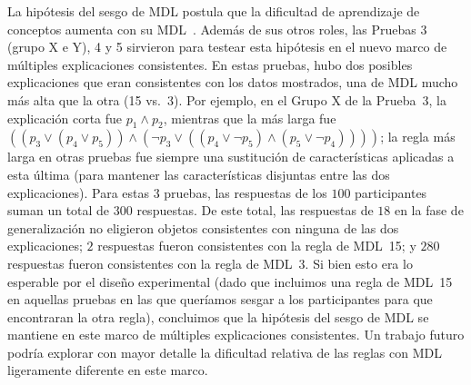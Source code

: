 La hipótesis del sesgo de MDL postula que la dificultad de aprendizaje de conceptos aumenta con su MDL~\cite{feldman2000minimization}. Además de sus otros roles, las Pruebas 3 (grupo X e Y), 4 y 5 sirvieron para testear esta hipótesis en el nuevo marco de múltiples explicaciones consistentes. En estas pruebas, hubo dos posibles explicaciones que eran consistentes con los datos mostrados, una de MDL mucho más alta que la otra (15 vs.\ 3). Por ejemplo, en el Grupo X de la Prueba~3, la explicación corta fue $ p_1 \land p_2 $, mientras que la más larga fue $ ((p_3 \lor (p_4 \lor p_5)) \land (\lnot p_3 \lor ( (p_4 \lor \lnot p_5) \land (p_5 \lor \lnot p_4)))) $; la regla más larga en otras pruebas fue siempre una sustitución de características aplicadas a esta última (para mantener las características disjuntas entre las dos explicaciones). Para estas 3 pruebas, las respuestas de los $ 100 $ participantes suman un total de $ 300 $ respuestas. De este total, las respuestas de $ 18 $ en la fase de generalización no eligieron objetos consistentes con ninguna de las dos explicaciones; $ 2 $ respuestas fueron consistentes con la regla de MDL~15; y $ 280 $ respuestas fueron consistentes con la regla de MDL~3. Si bien esto era lo esperable por el diseño experimental (dado que incluimos una regla de MDL~15 en aquellas pruebas en las que queríamos sesgar a los participantes para que encontraran la otra regla), concluimos que la hipótesis del sesgo de MDL se mantiene en este marco de múltiples explicaciones consistentes. Un trabajo futuro podría explorar con mayor detalle la dificultad relativa de las reglas con MDL ligeramente diferente en este marco.



